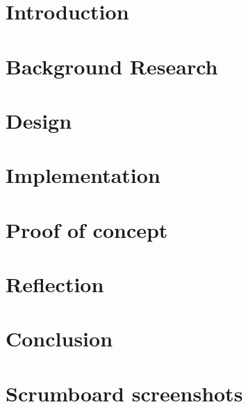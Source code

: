 \documentclass[]{report}
\begin{document}
\graphicspath{{img/}{../img/}}



\tableofcontents



\chapter{Introduction}


\chapter{Background Research}


\chapter{Design}


\chapter{Implementation}


\chapter{Proof of concept}


\chapter{Reflection}


\chapter{Conclusion}




\appendix
\chapter{Scrumboard screenshots}



\end{document}
